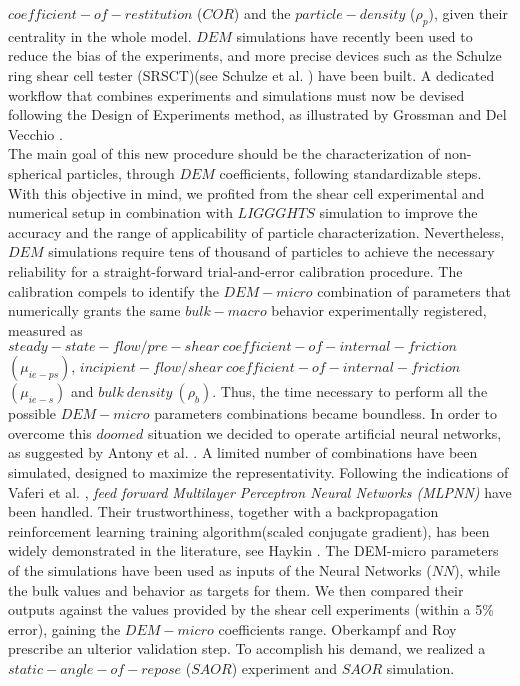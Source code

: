 $coefficient-of-restitution$ ($COR$) and the $particle-density$ ($\rho_p$),
given their centrality in the whole model.
$DEM$ simulations have recently been used to reduce the bias of the experiments, and more precise devices such as the Schulze ring shear cell tester (SRSCT)(see Schulze 
et al. \cite{RefWorks:104})
have been built.
A dedicated workflow that combines experiments and simulations must now be devised following the Design of Experiments method, as illustrated by Grossman and Del Vecchio \cite{RefWorks:116}.\\
The main goal of this new procedure should be the characterization of
non-spherical particles, through $DEM$ coefficients,
following standardizable steps.
With this objective in mind, we profited from the shear cell experimental and numerical setup in combination with $LIGGGHTS$ simulation to improve the accuracy and the range of
applicability of particle characterization.
Nevertheless, $DEM$ simulations require tens of thousand of particles to achieve the necessary reliability for a straight-forward trial-and-error calibration procedure.
The calibration compels to identify the $DEM-micro$ combination of parameters that numerically grants the same $bulk-macro$ behavior experimentally registered, measured as
$steady-state-flow/pre-shear ~ coefficient-of-internal-friction $ $ (\mu_{ie-ps})$, $incipient-flow/shear ~ coefficient-of-internal-friction $ $ (\mu_{ie-s})$ and $bulk ~ density ~
(\rho_b)$.
Thus, the time necessary to perform all the possible $DEM-micro$ parameters combinations became boundless.
In order to overcome this $doomed$ situation we decided to operate artificial
neural networks, as suggested by Antony et al. \cite{RefWorks:161}.
A limited number of combinations have been simulated, designed to maximize the representativity.
Following the indications of Vaferi et al. \cite{RefWorks:150}, \textit{feed forward Multilayer Perceptron Neural Networks (MLPNN)} have been handled.
Their trustworthiness, together with a backpropagation reinforcement learning training algorithm(scaled conjugate gradient), has been widely demonstrated in the literature, see
Haykin \cite{RefWorks:158}.
The DEM-micro parameters of the simulations have been used as inputs of the
Neural Networks ($NN$), while the bulk values and behavior as targets for them.
We then compared their outputs against the values provided by the shear cell
experiments (within a 5\% error), gaining the $DEM-micro$ coefficients range.
Oberkampf and Roy \cite{RefWorks:160} prescribe an ulterior validation step.
To accomplish his demand, we realized a $static-angle-of-repose$ ($SAOR$) experiment and $SAOR$ simulation.
